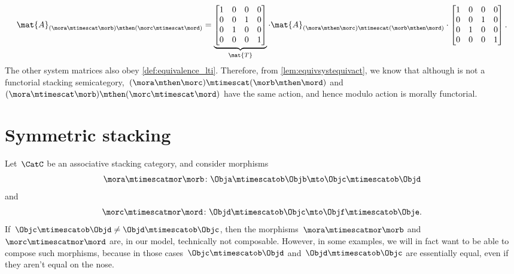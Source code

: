 \begin{example}
    \begin{equation}
        \mat{A}_{(\mora\mtimescat \morb)\mthen (\morc\mtimescat \mord)}=
        \underbrace{\begin{bmatrix}
                1 & 0 & 0 & 0 \\
                0 & 0 & 1 & 0 \\
                0 & 1 & 0 & 0 \\
                0 & 0 & 0 & 1
            \end{bmatrix}}_{\mat{T}}\cdot
        \mat{A}_{(\mora \mthen \morc)\mtimescat (\morb\mthen \mord)}
        \cdot
        \begin{bmatrix}
            1 & 0 & 0 & 0 \\
            0 & 0 & 1 & 0 \\
            0 & 1 & 0 & 0 \\
            0 & 0 & 0 & 1
        \end{bmatrix}.
    \end{equation}
    The other system matrices also obey \cref{def:equivalence_lti}.
    Therefore, from \cref{lem:equivsystequivact}, we know that although \LTI is not a functorial stacking semicategory,~$(\mora \mthen \morc)\mtimescat (\morb\mthen \mord)$ and~$(\mora\mtimescat \morb)\mthen (\morc\mtimescat \mord)$ have the same action, and hence \LTI modulo action is morally functorial.
\end{example}

\section{Symmetric stacking}

Let~$\CatC$ be an associative stacking category, and consider morphisms
\begin{equation}
    \mora \mtimescatmor \morb \colon \Obja \mtimescatob \Objb \mto \Objc \mtimescatob \Objd
\end{equation}
and
\begin{equation}
    \morc \mtimescatmor \mord \colon \Objd \mtimescatob \Objc \mto \Objf \mtimescatob \Obje.
\end{equation}
If~$\Objc \mtimescatob \Objd \neq \Objd \mtimescatob \Objc$, then the morphisms~$\mora \mtimescatmor \morb$ and~$\morc \mtimescatmor \mord$ are, in our model, technically not composable.
However, in some examples, we will in fact want to be able to compose such morphisms, because in those cases~$\Objc \mtimescatob \Objd$ and~$\Objd \mtimescatob \Objc$ are essentially equal, even if they aren't equal on the nose.

